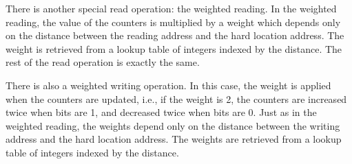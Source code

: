 There is another special read operation: the weighted reading. In the weighted reading, the value of the counters is multiplied by a weight which depends only on the distance between the reading address and the hard location address. The weight is retrieved from a lookup table of integers indexed by the distance. The rest of the read operation is exactly the same.

There is also a weighted writing operation. In this case, the weight is applied when the counters are updated, i.e., if the weight is 2, the counters are increased twice when bits are 1, and decreased twice when bits are 0. Just as in the weighted reading, the weights depend only on the distance between the writing address and the hard location address. The weights are retrieved from a lookup table of integers indexed by the distance.
